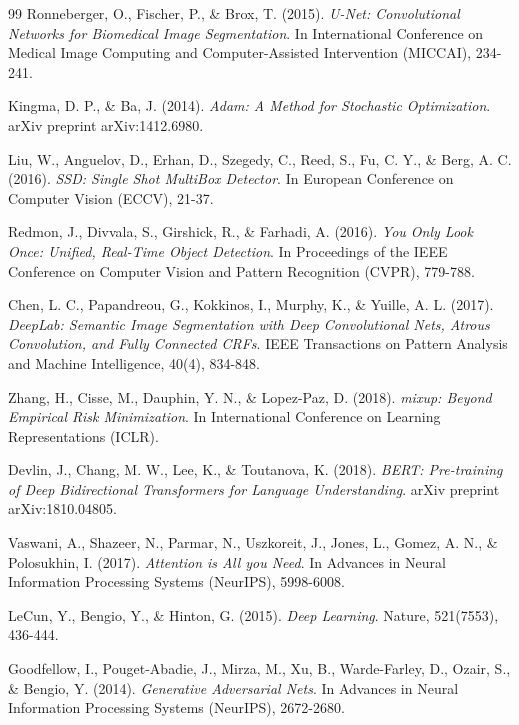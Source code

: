 \documentclass[12pt]{article}
\begin{document}
\begin{thebibliography}{99}
Ronneberger, O., Fischer, P., \& Brox, T. (2015).
\textit{U-Net: Convolutional Networks for Biomedical Image Segmentation}.
In International Conference on Medical Image Computing and Computer-Assisted Intervention (MICCAI), 234-241.

Kingma, D. P., \& Ba, J. (2014).
\textit{Adam: A Method for Stochastic Optimization}.
arXiv preprint arXiv:1412.6980.

Liu, W., Anguelov, D., Erhan, D., Szegedy, C., Reed, S., Fu, C. Y., \& Berg, A. C. (2016).
\textit{SSD: Single Shot MultiBox Detector}.
In European Conference on Computer Vision (ECCV), 21-37.

Redmon, J., Divvala, S., Girshick, R., \& Farhadi, A. (2016).
\textit{You Only Look Once: Unified, Real-Time Object Detection}.
In Proceedings of the IEEE Conference on Computer Vision and Pattern Recognition (CVPR), 779-788.

Chen, L. C., Papandreou, G., Kokkinos, I., Murphy, K., \& Yuille, A. L. (2017).
\textit{DeepLab: Semantic Image Segmentation with Deep Convolutional Nets, Atrous Convolution, and Fully Connected CRFs}.
IEEE Transactions on Pattern Analysis and Machine Intelligence, 40(4), 834-848.

Zhang, H., Cisse, M., Dauphin, Y. N., \& Lopez-Paz, D. (2018).
\textit{mixup: Beyond Empirical Risk Minimization}.
In International Conference on Learning Representations (ICLR).

Devlin, J., Chang, M. W., Lee, K., \& Toutanova, K. (2018).
\textit{BERT: Pre-training of Deep Bidirectional Transformers for Language Understanding}.
arXiv preprint arXiv:1810.04805.

Vaswani, A., Shazeer, N., Parmar, N., Uszkoreit, J., Jones, L., Gomez, A. N., \& Polosukhin, I. (2017).
\textit{Attention is All you Need}.
In Advances in Neural Information Processing Systems (NeurIPS), 5998-6008.

LeCun, Y., Bengio, Y., \& Hinton, G. (2015).
\textit{Deep Learning}.
Nature, 521(7553), 436-444.

Goodfellow, I., Pouget-Abadie, J., Mirza, M., Xu, B., Warde-Farley, D., Ozair, S., \& Bengio, Y. (2014).
\textit{Generative Adversarial Nets}.
In Advances in Neural Information Processing Systems (NeurIPS), 2672-2680.


\end{thebibliography}
\end{document}
